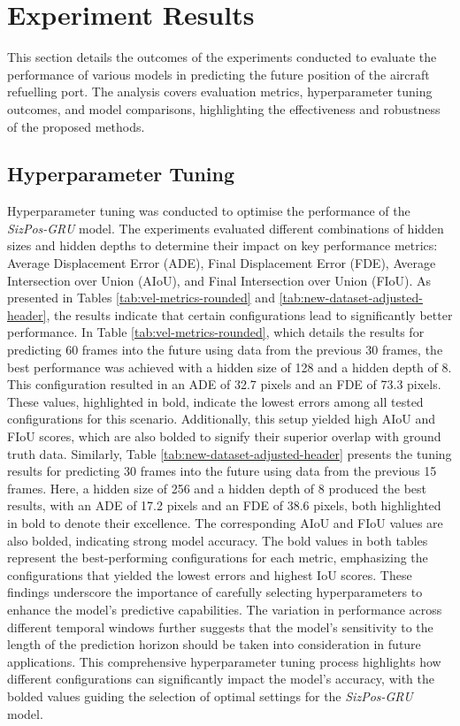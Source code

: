\documentclass[12pt,oneside]{book} %
\begin{document}
\section{Experiment Results}
This section details the outcomes of the experiments conducted to evaluate the
performance of various models in predicting the future position of the aircraft
refuelling port. The analysis covers evaluation metrics, hyperparameter tuning
outcomes, and model comparisons, highlighting the effectiveness and robustness
of the proposed methods.

\subsection{Hyperparameter Tuning}

Hyperparameter tuning was conducted to optimise the performance of the
\textit{SizPos-GRU} model. The experiments evaluated different combinations of
hidden sizes and hidden depths to determine their impact on key performance
metrics: Average Displacement Error (ADE), Final Displacement Error (FDE),
Average Intersection over Union (AIoU), and Final Intersection over Union
(FIoU). As presented in Tables \ref{tab:vel-metrics-rounded} and
\ref{tab:new-dataset-adjusted-header}, the results indicate that certain
configurations lead to significantly better performance. In Table
\ref{tab:vel-metrics-rounded}, which details the results for predicting 60
frames into the future using data from the previous 30 frames, the best
performance was achieved with a hidden size of 128 and a hidden depth of 8.
This configuration resulted in an ADE of 32.7 pixels and an FDE of 73.3 pixels.
These values, highlighted in bold, indicate the lowest errors among all tested
configurations for this scenario. Additionally, this setup yielded high AIoU
and FIoU scores, which are also bolded to signify their superior overlap with
ground truth data. Similarly, Table \ref{tab:new-dataset-adjusted-header}
presents the tuning results for predicting 30 frames into the future using data
from the previous 15 frames. Here, a hidden size of 256 and a hidden depth of 8
produced the best results, with an ADE of 17.2 pixels and an FDE of 38.6
pixels, both highlighted in bold to denote their excellence. The corresponding
AIoU and FIoU values are also bolded, indicating strong model accuracy. The
bold values in both tables represent the best-performing configurations for
each metric, emphasizing the configurations that yielded the lowest errors and
highest IoU scores. These findings underscore the importance of carefully
selecting hyperparameters to enhance the model’s predictive capabilities. The
variation in performance across different temporal windows further suggests
that the model’s sensitivity to the length of the prediction horizon should be
taken into consideration in future applications. This comprehensive
hyperparameter tuning process highlights how different configurations can
significantly impact the model’s accuracy, with the bolded values guiding the
selection of optimal settings for the \textit{SizPos-GRU} model.
\end{document}

